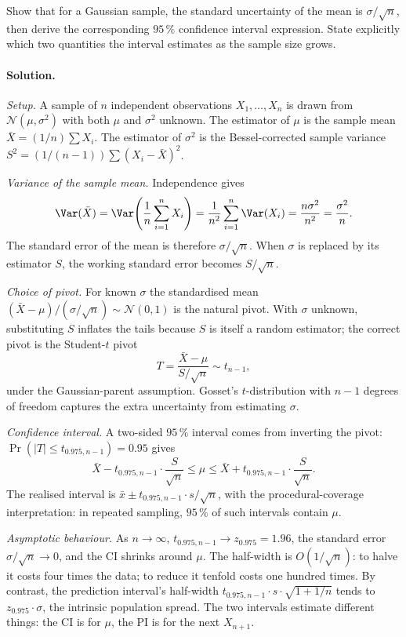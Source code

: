 \begin{exercise}
Show that for a Gaussian sample, the standard uncertainty of the
mean is $\sigma/\sqrt{n}$, then derive the corresponding $95 \,\%$
confidence interval expression. State explicitly which two
quantities the interval estimates as the sample size grows.
\end{exercise}

\paragraph{Solution.}
\textit{Setup.} A sample of $n$ independent observations
$X_{1}, \ldots, X_{n}$ is drawn from $\mathcal{N}(\mu, \sigma^{2})$
with both $\mu$ and $\sigma^{2}$ unknown. The estimator of $\mu$ is
the sample mean $\bar{X} = (1/n) \sum X_{i}$. The estimator of
$\sigma^{2}$ is the Bessel-corrected sample variance
$S^{2} = (1/(n-1)) \sum (X_{i} - \bar{X})^{2}$.

\textit{Variance of the sample mean.} Independence gives
\[
\Var(\bar{X}) = \Var\!\left(\frac{1}{n} \sum_{i=1}^{n} X_{i}\right)
= \frac{1}{n^{2}} \sum_{i=1}^{n} \Var(X_{i})
= \frac{n \sigma^{2}}{n^{2}}
= \frac{\sigma^{2}}{n}.
\]
The standard error of the mean is therefore $\sigma/\sqrt{n}$. When
$\sigma$ is replaced by its estimator $S$, the working standard
error becomes $S/\sqrt{n}$.

\textit{Choice of pivot.} For known $\sigma$ the standardised mean
$(\bar{X} - \mu)/(\sigma/\sqrt{n}) \sim \mathcal{N}(0, 1)$ is the
natural pivot. With $\sigma$ unknown, substituting $S$ inflates the
tails because $S$ is itself a random estimator; the correct pivot
is the Student-$t$ pivot
\[
T = \frac{\bar{X} - \mu}{S/\sqrt{n}} \sim t_{n-1},
\]
under the Gaussian-parent assumption. Gosset's $t$-distribution
with $n - 1$ degrees of freedom captures the extra uncertainty
from estimating $\sigma$.

\textit{Confidence interval.} A two-sided $95 \,\%$ interval comes
from inverting the pivot: $\Pr(|T| \leq t_{0.975, n-1}) = 0.95$
gives
\[
\bar{X} - t_{0.975, n-1} \cdot \frac{S}{\sqrt{n}} \leq \mu
\leq \bar{X} + t_{0.975, n-1} \cdot \frac{S}{\sqrt{n}}.
\]
The realised interval is
$\bar{x} \pm t_{0.975, n-1} \cdot s/\sqrt{n}$, with the
procedural-coverage interpretation: in repeated sampling, $95 \,\%$
of such intervals contain $\mu$.

\textit{Asymptotic behaviour.} As $n \to \infty$,
$t_{0.975, n-1} \to z_{0.975} = 1.96$, the standard error
$\sigma/\sqrt{n} \to 0$, and the CI shrinks around $\mu$. The
half-width is $O(1/\sqrt{n})$: to halve it costs four times the
data; to reduce it tenfold costs one hundred times. By contrast,
the prediction interval's half-width
$t_{0.975, n-1} \cdot s \cdot \sqrt{1 + 1/n}$ tends to
$z_{0.975} \cdot \sigma$, the intrinsic population spread. The two
intervals estimate different things: the CI is for $\mu$, the PI
is for the next $X_{n+1}$.

